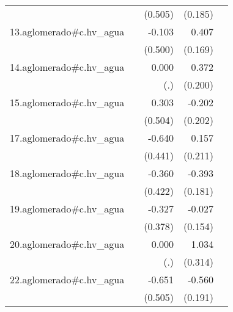 {\begin{longtable}{l*{4}{D{.}{.}{-1}}}
            &                     &     (0.505)         &     (0.185)         &                     \\
\addlinespace
13.aglomerado#c.hv\_agua&                     &      -0.103         &       0.407\sym{*}  &                     \\
            &                     &     (0.500)         &     (0.169)         &                     \\
\addlinespace
14.aglomerado#c.hv\_agua&                     &       0.000         &       0.372         &                     \\
            &                     &         (.)         &     (0.200)         &                     \\
\addlinespace
15.aglomerado#c.hv\_agua&                     &       0.303         &      -0.202         &                     \\
            &                     &     (0.504)         &     (0.202)         &                     \\
\addlinespace
17.aglomerado#c.hv\_agua&                     &      -0.640         &       0.157         &                     \\
            &                     &     (0.441)         &     (0.211)         &                     \\
\addlinespace
18.aglomerado#c.hv\_agua&                     &      -0.360         &      -0.393\sym{*}  &                     \\
            &                     &     (0.422)         &     (0.181)         &                     \\
\addlinespace
19.aglomerado#c.hv\_agua&                     &      -0.327         &      -0.027         &                     \\
            &                     &     (0.378)         &     (0.154)         &                     \\
\addlinespace
20.aglomerado#c.hv\_agua&                     &       0.000         &       1.034\sym{***}&                     \\
            &                     &         (.)         &     (0.314)         &                     \\
\addlinespace
22.aglomerado#c.hv\_agua&                     &      -0.651         &      -0.560\sym{**} &                     \\
            &                     &     (0.505)         &     (0.191)         &                     \\

\end{longtable}}
